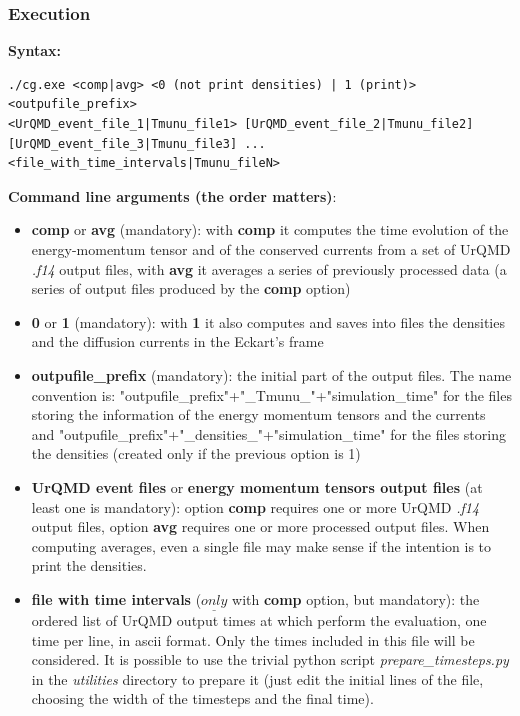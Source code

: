\documentclass[12pt, a4paper]{article}
\begin{document}
\subsubsection{Execution}
\textbf{Syntax:}
\begin{footnotesize}
\begin{verbatim}
./cg.exe <comp|avg> <0 (not print densities) | 1 (print)> <outpufile_prefix>
<UrQMD_event_file_1|Tmunu_file1> [UrQMD_event_file_2|Tmunu_file2]
[UrQMD_event_file_3|Tmunu_file3] ... <file_with_time_intervals|Tmunu_fileN>
\end{verbatim}
\end{footnotesize}
\textbf{Command line arguments (the order matters)}:
\begin{itemize}
	\item \textbf{comp} or \textbf{avg} (mandatory): with \textbf{comp} it computes the time evolution of the energy-momentum tensor and of the conserved currents from a set of UrQMD \emph{.f14} output files, with  \textbf{avg} it averages a series of previously processed data (a series of output files produced by the \textbf{comp} option)
	\item \textbf{0} or \textbf{1} (mandatory): with \textbf{1} it also computes and saves into files the densities and the diffusion currents in the Eckart's frame
	\item \textbf{outpufile\_prefix} (mandatory): the initial part of the output files. The name convention is: "outpufile\_prefix"+"\_Tmunu\_"+"simulation\_time" for the files storing the information of the energy momentum tensors and the currents and "outpufile\_prefix"+"\_densities\_"+"simulation\_time" for the files storing the densities (created only if the previous option is 1)
	\item \textbf{UrQMD event files} or \textbf{energy momentum tensors output files} (at least one is mandatory): option \textbf{comp} requires one or more UrQMD \emph{.f14} output files,  option \textbf{avg} requires one or more processed output files. When computing averages, even a single file may make sense if the intention is to print the densities.
	\item \textbf{file with time intervals} ($\underline{only}$ with \textbf{comp} option, but mandatory): the ordered list of UrQMD output times at which perform the evaluation, one time per line, in ascii format. Only the times included in this file will be considered. It is possible to use the trivial python script \emph{prepare\_timesteps.py} in the \emph{utilities} directory to prepare it (just edit the initial lines of the file, choosing the width of the timesteps and the final time).
\end{itemize}
\end{document}
